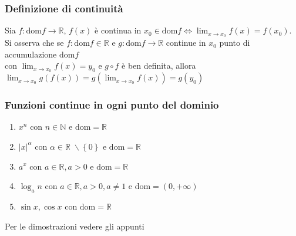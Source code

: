 \documentclass[a4paper]{article}
\newcommand\dom{\text{dom}}
\begin{document}
\subsubsection*{Definizione di continuità}
Sia \(f: \dom f \to \mathbb{R}\), \(f(x)\) è continua in \(x_0 \in \dom f \Leftrightarrow \displaystyle \lim_{x \to x_0} f(x) = f(x_0)\). \\
Si osserva che se \(f: \dom f \in \mathbb{R}\) e \(g: \dom f \to \mathbb{R}\) continue in \(x_0\) punto di accumulazione \(\dom f\) \\ 
con \(\displaystyle \lim_{x \to x_0} f(x) = y_0\) e \(g \circ f\) è ben definita, allora \(\displaystyle \lim_{x \to x_0} g(f(x)) = g\left( \lim_{x \to x_0} f(x) \right) = g(y_0)\)

\subsubsection*{Funzioni continue in ogni punto del dominio}
\begin{enumerate}
	\item \(x^n\) con \(n \in \mathbb{N}\) e \(\dom = \mathbb{R}\)
	\item \(\left| x \right| ^ \alpha\) con \(\alpha \in \mathbb{R} \; \backslash \left\{ 0 \right\}\) e \(\dom = \mathbb{R}\)
	\item \(a^x\) con \(a \in \mathbb{R}, a > 0\) e \(\dom = \mathbb{R}\)
	\item \(\log_a n\) con \(a \in \mathbb{R}, a > 0, a \neq 1\) e \(\dom = \left(0, + \infty \right)\)
	\item \(\sin x, \cos x\) con \(\dom = \mathbb{R}\)
\end{enumerate}
Per le dimostrazioni vedere gli appunti
\end{document}
